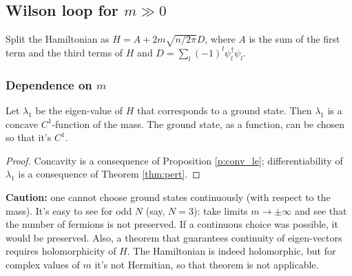 \subsection{Wilson loop for $m \gg 0$}
Split the Hamiltonian as $H = A + 2m\sqrt{n/2\pi} D$, where $A$ is the sum of the first term and the third terms of $H$ and $D = \sum_l (-1)^l \psi_l^\dagger \psi_l$.
\subsubsection{Dependence on $m$}
\begin{proposition}\label{p:dep_m}
Let $\lambda_1$ be the eigen-value of $H$ that corresponds to a ground state. Then $\lambda_1$ is a concave $C^1$-function of the mass. The ground state, as a function, can be chosen so that it's $C^1$.
\end{proposition}
\begin{proof}
Concavity is a consequence of Proposition \ref{p:conv_le}; differentiability of $\lambda_1$ is a consequence of Theorem \ref{thm:pert}.
\end{proof}

\noindent \textbf{Caution:} one cannot choose ground states continuously (with respect to the mass). It's easy to see for odd $N$ (say, $N=3$): take limits $m\rightarrow \pm \infty$ and see that the number of fermions is not preserved. If a continuous choice was possible, it would be preserved. Also, a theorem that guarantees continuity of eigen-vectors requires holomorphicity of $H$. The Hamiltonian is indeed holomorphic, but for complex values of $m$ it's not Hermitian, so that theorem is not applicable.

